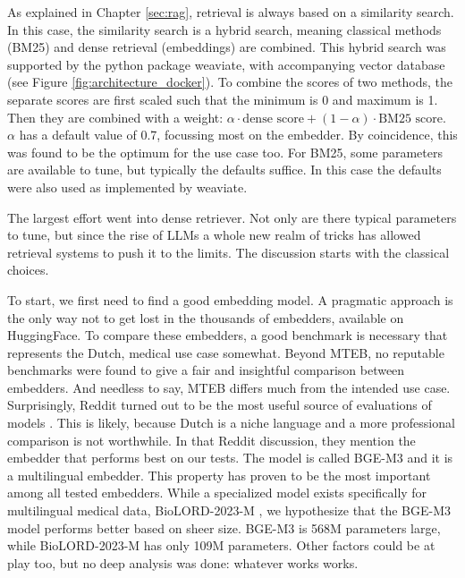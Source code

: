 As explained in Chapter \ref{sec:rag}, retrieval is always based on a similarity search. In this case, the similarity search is a hybrid search, meaning classical methods (BM25) and dense retrieval (embeddings) are combined. This hybrid search was supported by the python package weaviate, with accompanying vector database (see Figure \ref{fig:architecture_docker}). To combine the scores of two methods, the separate scores are first scaled such that the minimum is 0 and maximum is 1. Then they are combined with a weight: $\alpha \cdot \text{dense score} + (1-\alpha) \cdot \text{BM25 score}$. $\alpha$ has a default value of 0.7, focussing most on the embedder. By coincidence, this was found to be the optimum for the use case too. For BM25, some parameters are available to tune, but typically the defaults suffice. In this case the defaults were also used as implemented by weaviate.

The largest effort went into dense retriever. Not only are there typical parameters to tune, but since the rise of LLMs a whole new realm of tricks has allowed retrieval systems to push it to the limits. The discussion starts with the classical choices.

To start, we first need to find a good embedding model. A pragmatic approach is the only way not to get lost in the thousands of embedders, available on HuggingFace. To compare these embedders, a good benchmark is necessary that represents the Dutch, medical use case somewhat. Beyond MTEB, no reputable benchmarks were found to give a fair and insightful comparison between embedders. And needless to say, MTEB differs much from the intended use case. Surprisingly, Reddit turned out to be the most useful source of evaluations of models \cite{reddit2025embedding}. This is likely, because Dutch is a niche language and a more professional comparison is not worthwhile. In that Reddit discussion, they mention the embedder that performs best on our tests. The model is called BGE-M3 and it is a multilingual embedder. This property has proven to be the most important among all tested embedders. While a specialized model exists specifically for multilingual medical data, BioLORD-2023-M \cite{remy2024biolord}, we hypothesize that the BGE-M3 model performs better based on sheer size. BGE-M3 is 568M parameters large, while BioLORD-2023-M has only 109M parameters. Other factors could be at play too, but no deep analysis was done: whatever works works.

